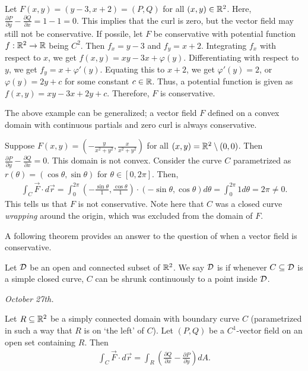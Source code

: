 \begin{example}
    Let $F(x,y) = (y-3,x+2) = (P,Q)$ for all $(x,y) \in \mathbb{R}^{2}$. Here, $\frac{\partial P}{\partial y} - \frac{\partial Q}{\partial x} = 1 -1 = 0$. This implies that the curl is zero, but the vector field may still not be conservative. If possile, let $F$ be conservative with potential function $f:\mathbb{R}^{2} \to \mathbb{R}$ being $C^{2}$. Then $f_{x} = y-3$ and $f_{y} = x+2$. Integrating $f_{x}$ with respect to $x$, we get $f(x,y) = xy - 3x + \varphi(y)$. Differentiating with respect to $y$, we get $f_{y} = x + \varphi'(y)$. Equating this to $x+2$, we get $\varphi'(y) = 2$, or $\varphi(y) = 2y + c$ for some constant $c \in \mathbb{R}$. Thus, a potential function is given as $f(x,y) = xy - 3x + 2y + c$. Therefore, $F$ is conservative.
\end{example}

The above example can be generalized; a vector field $F$ defined on a convex domain with continuous partials and zero curl is always conservative.

\begin{example}
    Suppose $F(x,y) = (-\frac{y}{x^{2}+y^{2}}, \frac{x}{x^{2}+y^{2}})$ for all $(x,y) = \mathbb{R}^{2}\setminus (0,0)$. Then $\frac{\partial P}{\partial y} - \frac{\partial Q}{\partial x} = 0$. This domain is not convex. Consider the curve $C$ parametrized as $r(\theta) = (\cos \theta, \sin \theta)$ for $\theta \in [0,2\pi]$. Then,
    \begin{align}
        \int_{C} \vec{F} \cdot d\vec{r} = \int_{0}^{2\pi} \left( -\frac{\sin \theta}{1}, \frac{\cos \theta}{1} \right) \cdot (-\sin \theta, \cos \theta) d\theta = \int_{0}^{2\pi} 1 d\theta = 2\pi \neq 0.
    \end{align}
    This tells us that $F$ is not conservative. Note here that $C$ was a closed curve \textit{wrapping} around the origin, which was excluded from the domain of $F$.
\end{example}

A following theorem provides an answer to the question of when a vector field is conservative.

\begin{definition}
    Let $\mathcal{D}$ be an open and connected subset of $\mathbb{R}^{2}$. We say $\mathcal{D}$ is  if whenever $C \subseteq \mathcal{D}$ is a simple closed curve, $C$ can be shrunk continuously to a point inside $\mathcal{D}$.
\end{definition}

\textit{October 27th.}

\begin{theorem}
    Let $R \subseteq \mathbb{R}^{2}$ be a simply connected domain with boundary curve $C$ (parametrized in such a way that $R$ is on `the left' of $C$). Let $(P,Q)$ be a $C^{1}$-vector field on an open set containing $R$. Then
    \begin{align}
        \int_{C} \vec{F} \cdot d\vec{r} = \int_{R} \left( \frac{\partial Q}{\partial x} - \frac{\partial P}{\partial y} \right) dA.
    \end{align}
\end{theorem}

